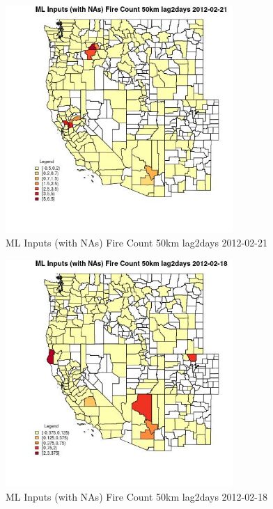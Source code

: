 \begin{figure} 
\centering  
\includegraphics[width=0.77\textwidth]{Code_Outputs/Report_ML_input_PM25_Step4_part_f_de_duplicated_aves_prioritize_24hr_obswNAs_CountyFire_Count_50km_lag2daysMean2012-02-21.jpg} 
\caption{\label{fig:Report_ML_input_PM25_Step4_part_f_de_duplicated_aves_prioritize_24hr_obswNAsCountyFire_Count_50km_lag2daysMean2012-02-21}ML Inputs (with NAs) Fire Count 50km lag2days 2012-02-21} 
\end{figure} 
 

\begin{figure} 
\centering  
\includegraphics[width=0.77\textwidth]{Code_Outputs/Report_ML_input_PM25_Step4_part_f_de_duplicated_aves_prioritize_24hr_obswNAs_CountyFire_Count_50km_lag2daysMean2012-02-18.jpg} 
\caption{\label{fig:Report_ML_input_PM25_Step4_part_f_de_duplicated_aves_prioritize_24hr_obswNAsCountyFire_Count_50km_lag2daysMean2012-02-18}ML Inputs (with NAs) Fire Count 50km lag2days 2012-02-18} 
\end{figure} 
 

